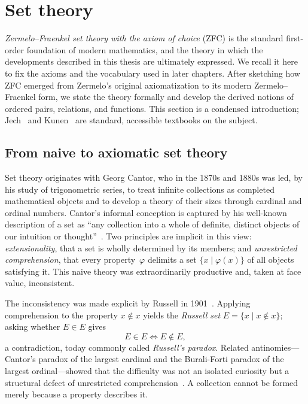 \section{Set theory}
\label{sec:set-theory}

\emph{Zermelo--Fraenkel set theory with the axiom of choice} (ZFC) is the
standard first-order foundation of modern mathematics, and the theory in which
the developments described in this thesis are ultimately expressed. We
recall it here to fix the axioms and the vocabulary used in later chapters.
After sketching how ZFC emerged from Zermelo's original axiomatization to its
modern Zermelo--Fraenkel form, we state the theory formally and develop the
derived notions of ordered pairs, relations, and functions. This section is a
condensed introduction; Jech~\cite{jech2003set} and Kunen~\cite{kunen2011set}
are standard, accessible textbooks on the subject.

\subsection{From naive to axiomatic set theory}
\label{subsec:set-theory-history}

Set theory originates with Georg Cantor, who in the 1870s and 1880s was led, by
his study of trigonometric series, to treat infinite collections as completed
mathematical objects and to develop a theory of their sizes through cardinal and
ordinal numbers. Cantor's informal conception is captured by his well-known
description of a set as ``any collection into a whole of definite, distinct
objects of our intuition or thought''~\cite{CSB_thm}. Two principles
are implicit in this view: \emph{extensionality}, that a set is wholly
determined by its members; and \emph{unrestricted comprehension}, that every
property~$\varphi$ delimits a set $\{x \mid \varphi(x)\}$ of all objects
satisfying it. This naive theory was extraordinarily productive and, taken at
face value, inconsistent.

The inconsistency was made explicit by Russell in 1901~\cite{russell1903principles}.
Applying comprehension to the property $x \notin x$ yields the
\emph{Russell set} $E = \{x \mid x \notin x\}$; asking whether $E \in E$ gives
\[
  E \in E \iff E \notin E,
\]
a contradiction, today commonly called \emph{Russell's paradox}.
Related antinomies---Cantor's paradox of the largest cardinal
and the Burali-Forti paradox of the largest ordinal---showed that the difficulty
was not an isolated curiosity but a structural defect of unrestricted
comprehension~\cite{vanHeijenoort1967}. A collection cannot be formed merely
because a property describes it.

